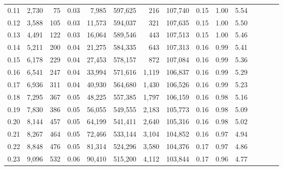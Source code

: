\begin{tabular}{rrrcrrrrrrrrrrr}
0.11 &   2,730 &     75 &                                       0.03 &    7,985 &  597,625 &      216 &  107,740 &  0.15 &  1.00 &                         5.54 \\
0.12 &   3,588 &    105 &                                       0.03 &   11,573 &  594,037 &      321 &  107,635 &  0.15 &  1.00 &                         5.50 \\
0.13 &   4,491 &    122 &                                       0.03 &   16,064 &  589,546 &      443 &  107,513 &  0.15 &  1.00 &                         5.46 \\
0.14 &   5,211 &    200 &                                       0.04 &   21,275 &  584,335 &      643 &  107,313 &  0.16 &  0.99 &                         5.41 \\
0.15 &   6,178 &    229 &                                       0.04 &   27,453 &  578,157 &      872 &  107,084 &  0.16 &  0.99 &                         5.36 \\
0.16 &   6,541 &    247 &                                       0.04 &   33,994 &  571,616 &    1,119 &  106,837 &  0.16 &  0.99 &                         5.29 \\
0.17 &   6,936 &    311 &                                       0.04 &   40,930 &  564,680 &    1,430 &  106,526 &  0.16 &  0.99 &                         5.23 \\
0.18 &   7,295 &    367 &                                       0.05 &   48,225 &  557,385 &    1,797 &  106,159 &  0.16 &  0.98 &                         5.16 \\
0.19 &   7,830 &    386 &                                       0.05 &   56,055 &  549,555 &    2,183 &  105,773 &  0.16 &  0.98 &                         5.09 \\
0.20 &   8,144 &    457 &                                       0.05 &   64,199 &  541,411 &    2,640 &  105,316 &  0.16 &  0.98 &                         5.02 \\
0.21 &   8,267 &    464 &                                       0.05 &   72,466 &  533,144 &    3,104 &  104,852 &  0.16 &  0.97 &                         4.94 \\
0.22 &   8,848 &    476 &                                       0.05 &   81,314 &  524,296 &    3,580 &  104,376 &  0.17 &  0.97 &                         4.86 \\
0.23 &   9,096 &    532 &                                       0.06 &   90,410 &  515,200 &    4,112 &  103,844 &  0.17 &  0.96 &                         4.77 \\

\end{tabular}
